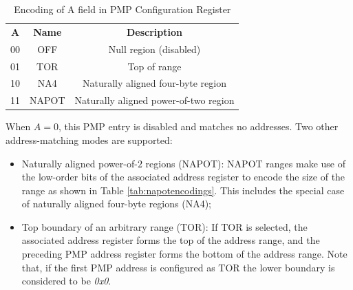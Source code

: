 \begin{table}
  \centering
  \begin{tabular}{|c|c|c|}
    \hline
    \textbf{A}       & \textbf{Name} & \textbf{Description}                  \\
    \hhline {===} 00 & OFF           & Null region (disabled)                \\
    \hline
    01               & TOR           & Top of range                          \\
    \hline
    10               & NA4           & Naturally aligned four-byte region    \\
    \hline
    11               & NAPOT         & Naturally aligned power-of-two region \\
    \hline
  \end{tabular}
  \caption{Encoding of A field in PMP Configuration Register}
  \label{tab:addressmatching}
\end{table}

When $A=0$, this PMP entry is disabled and matches no addresses. Two other
address-matching modes are supported:
\begin{itemize}
  \item Naturally aligned power-of-$2$ regions (NAPOT): NAPOT ranges make use of
    the low-order bits of the associated address register to encode the size of
    the range as shown in Table \ref{tab:napotencodings}. This includes the special
    case of naturally aligned four-byte regions (NA4);

  \item Top boundary of an arbitrary range (TOR): If TOR is selected, the associated
    address register forms the top of the address range, and the preceding PMP
    address register forms the bottom of the address range. Note that, if the
    first PMP address is configured as TOR the lower boundary is considered to
    be \textit{0x0}.
\end{itemize}

